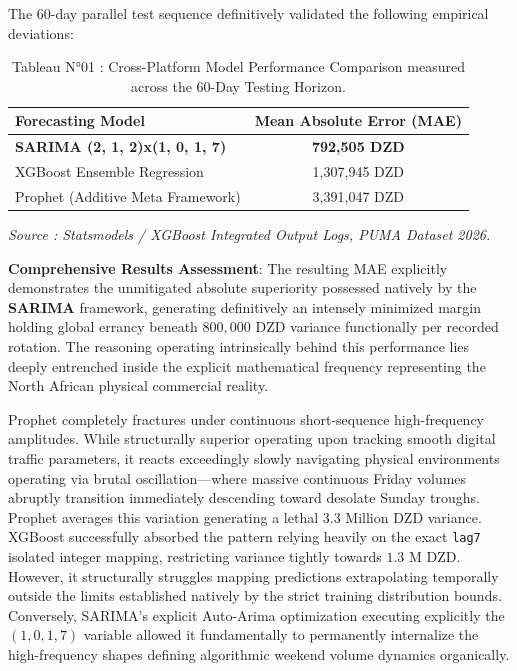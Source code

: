 \documentclass[12pt,a4paper]{report}
\begin{document}
The 60-day parallel test sequence definitively validated the following empirical deviations:
\begin{table}[H]
    \centering
    \begin{tabular}{lc}
    \toprule
    \textbf{Forecasting Model} & \textbf{Mean Absolute Error (MAE)} \\
    \midrule
    \textbf{SARIMA (2, 1, 2)x(1, 0, 1, 7)} & \textbf{792,505 DZD} \\
    XGBoost Ensemble Regression & 1,307,945 DZD \\
    Prophet (Additive Meta Framework) & 3,391,047 DZD \\
    \bottomrule
    \end{tabular}
    \caption{Tableau N°01 : Cross-Platform Model Performance Comparison measured across the 60-Day Testing Horizon.}
    \label{tab:mae_comparison}
\end{table}
\vspace{-0.5cm}
\begin{center}
    \footnotesize{\textit{Source : Statsmodels / XGBoost Integrated Output Logs, PUMA Dataset 2026.}}
\end{center}

\textbf{Comprehensive Results Assessment}: 
The resulting MAE explicitly demonstrates the unmitigated absolute superiority possessed natively by the \textbf{SARIMA} framework, generating definitively an intensely minimized margin holding global errancy beneath $800,000$ DZD variance functionally per recorded rotation. The reasoning operating intrinsically behind this performance lies deeply entrenched inside the explicit mathematical frequency representing the North African physical commercial reality. 

Prophet completely fractures under continuous short-sequence high-frequency amplitudes. While structurally superior operating upon tracking smooth digital traffic parameters, it reacts exceedingly slowly navigating physical environments operating via brutal oscillation—where massive continuous Friday volumes abruptly transition immediately descending toward desolate Sunday troughs. Prophet averages this variation generating a lethal $3.3$ Million DZD variance. XGBoost successfully absorbed the pattern relying heavily on the exact \texttt{lag7} isolated integer mapping, restricting variance tightly towards $1.3$ M DZD. However, it structurally struggles mapping predictions extrapolating temporally outside the limits established natively by the strict training distribution bounds. 
Conversely, SARIMA’s explicit Auto-Arima optimization executing explicitly the $(1,0,1,7)$ variable allowed it fundamentally to permanently internalize the high-frequency shapes defining algorithmic weekend volume dynamics organically.
\end{document}
